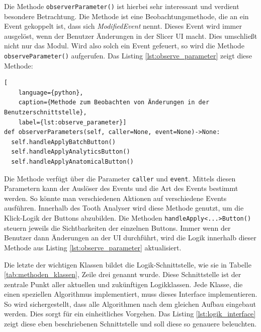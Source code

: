 Die Methode \texttt{observerParameter()} ist hierbei sehr interessant und verdient
besondere Betrachtung. Die Methode ist eine Beobachtungsmethode, die an ein Event
gekoppelt ist, dass sich \textit{ModifiedEvent} nennt. Dieses Event wird immer
ausgelöst, wenn der Benutzer Änderungen in der Slicer \ac{UI} macht. Dies umschließt
nicht nur das Modul. Wird also solch ein Event gefeuert, so wird die Methode \texttt{observeParameter()}
aufgerufen. Das Listing \ref{lst:observe_parameter} zeigt diese Methode:

\begin{lstlisting}[
    language={python},
    caption={Methode zum Beobachten von Änderungen in der Benutzerschnittstelle},
    label={lst:observe_parameter}]
def observerParameters(self, caller=None, event=None)->None:
  self.handleApplyBatchButton()
  self.handleApplyAnalyticsButton()
  self.handleApplyAnatomicalButton()
\end{lstlisting}

Die Methode verfügt über die Parameter \texttt{caller} und \texttt{event}. Mittels
diesen Parametern kann der Auslöser des Events und die Art des Events bestimmt werden.
So könnte man verschiedenen Aktionen auf verschiedene Events ausführen. Innerhalb
des Tooth Analyser wird diese Methode genutzt, um die Klick-Logik der Buttons
abzubilden. Die Methoden \texttt{handleApply<...>Button()} steuern jeweils die
Sichtbarkeiten der einzelnen Buttons. Immer wenn der Benutzer dann Änderungen an
der \ac{UI} durchführt, wird die Logik innerhalb dieser Methode aus Listing \ref{lst:observe_parameter}
aktualisiert.

Die letzte der wichtigen Klassen bildet die Logik-Schnittstelle, wie sie in
Tabelle \ref{tab:methoden_klassen}, Zeile drei genannt wurde. Diese
Schnittstelle ist der zentrale Punkt aller aktuellen und zukünftigen
Logikklassen. Jede Klasse, die einen speziellen Algorithmus implementiert, muss dieses
Interface implementieren. So wird sichergestellt, dass alle Algorithmen nach dem
gleichen Aufbau eingebaut werden. Dies sorgt für ein einheitliches Vorgehen. Das
Listing \ref{lst:logik_interface} zeigt diese eben beschriebenen Schnittstelle und
soll diese so genauere beleuchten.

\pagebreak

